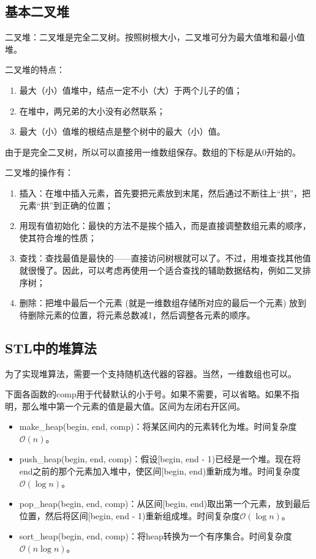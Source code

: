 \subsection{基本二叉堆}

二叉堆：二叉堆是完全二叉树。按照树根大小，二叉堆可分为最大值堆和最小值堆。

二叉堆的特点：

\begin{enumerate}
  \item 最大（小）值堆中，结点一定不小（大）于两个儿子的值；
  \item 在堆中，两兄弟的大小没有必然联系；
  \item 最大（小）值堆的根结点是整个树中的最大（小）值。
\end{enumerate}

由于是完全二叉树，所以可以直接用一维数组保存。数组的下标是从0开始的。

二叉堆的操作有：

\begin{enumerate}
  \item 插入：在堆中插入元素，首先要把元素放到末尾，然后通过不断往上“拱”，把元素“拱”到正确的位置；
  \item 用现有值初始化：最快的方法不是挨个插入，而是直接调整数组元素的顺序，使其符合堆的性质；
  \item 查找：查找最值是最快的——直接访问树根就可以了。不过，用堆查找其他值就很慢了。因此，可以考虑再使用一个适合查找的辅助数据结构，例如二叉排序树；
  \item 删除：把堆中最后一个元素 (就是一维数组存储所对应的最后一个元素) 放到待删除元素的位置，将元素总数减1，然后调整各元素的顺序。
\end{enumerate}



\subsection{STL中的堆算法}

为了实现堆算法，需要一个支持随机迭代器的容器。当然，一维数组也可以。

下面各函数的comp用于代替默认的小于号。如果不需要，可以省略。如果不指明，那么堆中第一个元素的值是最大值。区间为左闭右开区间。

\begin{itemize}
  \item make\_heap(begin, end, comp)：将某区间内的元素转化为堆。时间复杂度$\mathcal{O}(n)$。
  \item push\_heap(begin, end, comp)：假设[begin, end - 1)已经是一个堆。现在将end之前的那个元素加入堆中，使区间[begin, end)重新成为堆。时间复杂度$\mathcal{O}(\log n)$。
  \item pop\_heap(begin, end, comp)：从区间[begin, end)取出第一个元素，放到最后位置，然后将区间[begin, end - 1)重新组成堆。时间复杂度$\mathcal{O}(\log n)$。
  \item sort\_heap(begin, end, comp)：将heap转换为一个有序集合。时间复杂度$\mathcal{O}(n\log n)$。
\end{itemize}


